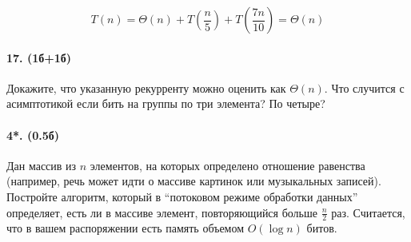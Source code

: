 \documentclass{article}
\begin{document}
$$T(n)=\Theta(n)+T\left(\dfrac n 5\right)+T\left(\dfrac{7n}{10}\right)=\Theta(n)$$

\paragraph{17. (1б+1б)} Докажите, что указанную рекурренту можно оценить как $\Theta(n)$. Что случится с асимптотикой если бить на группы по три элемента? По четыре?
\paragraph{4*. (0.5б)} Дан массив из $n$ элементов, на которых определено отношение равенства (например, речь может идти о массиве картинок или музыкальных записей). Постройте алгоритм, который в ``потоковом режиме обработки данных'' определяет, есть ли в массиве элемент, повторяющийся больше $\frac{n}{2}$ раз. Считается, что в вашем распоряжении есть память объемом $O(\log n)$ битов. 
\end{document}
